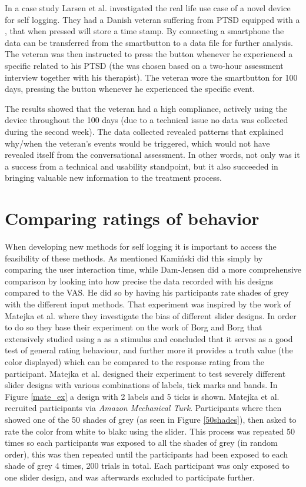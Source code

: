 In a case study Larsen et al.\cite{eg} investigated the real life use case of a novel device for self logging. They had a Danish veteran suffering from PTSD equipped with a , that when pressed will store a time stamp. By connecting a smartphone the data can be transferred from the smartbutton to a data file for further analysis. The veteran was then instructed to press the button whenever he experienced a specific  related to his PTSD (the  was chosen based on a two-hour assessment interview together with his therapist). The veteran wore the smartbutton for 100 days, pressing the button whenever he experienced the specific event.

The results showed that the veteran had a high compliance, actively using the device throughout the 100 days (due to a technical issue no data was collected during the second week). The data collected revealed patterns that explained why/when the veteran's events would be triggered, which would not have revealed itself from the conversational assessment. In other words, not only was it a success from a technical and usability standpoint, but it also succeeded in bringing valuable new information to the treatment process. 







\section{Comparing ratings of behavior}
When developing new methods for self logging it is important to access the feasibility of these methods. As mentioned Kami\'nski did this simply by comparing the user interaction time, while Dam-Jensen did a more comprehensive comparison by looking into how precise the data recorded with his designs compared to the VAS. He did so by having his participants rate shades of grey with the different input methods. That experiment was inspired by the work of Matejka et al.\cite{grey} where they investigate the bias of different slider designs. In order to do so they base their experiment on the work of Borg and Borg\cite{borg} that extensively studied using a  as a stimulus and concluded that it serves as a good test of general rating behaviour, and further more it provides a truth value (the color displayed) which can be compared to the response rating from the participant. Matejka et al. designed their experiment to test severely different slider designs with various combinations of labels, tick marks and bands. In Figure \ref{mate_ex} a design with 2 labels and 5 ticks is shown. Matejka et al. recruited participants via \emph{Amazon Mechanical Turk}\cite{turk}. Participants where then showed one of the 50 shades of grey (as seen in Figure \ref{50shades}), then asked to rate the color from white to blakc using the slider. This process was repeated 50 times so each participants was exposed to all the shades of grey (in random order), this was then repeated until the participants had been exposed to each shade of grey 4 times, 200 trials in total. Each participant was only exposed to one slider design, and was afterwards excluded to participate further. 

